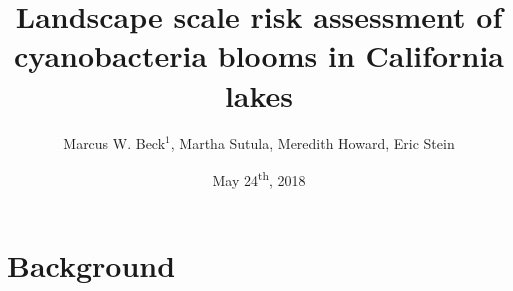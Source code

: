 \documentclass[serif]{beamer}\usepackage[]{graphicx}\usepackage[]{color}
\begin{document}
\title[Risk assessment for CA lakes]{\textbf{Landscape scale risk assessment of cyanobacteria blooms in California lakes}}
\author[Beck et al.]{Marcus W. Beck$^1$, Martha Sutula, Meredith Howard, Eric Stein}


\date{May 24\textsuperscript{th}, 2018}


\begin{frame}[shrink]
\vspace{0.2in}
\titlepage
\end{frame}

\section{Background}
\end{document}
